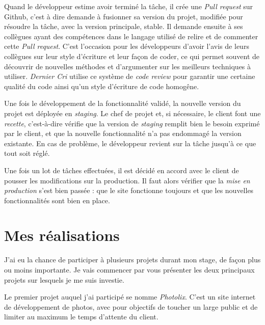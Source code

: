 \bigskip

Quand le développeur estime avoir terminé la tâche, il crée une
\emph{Pull request} sur Github, c'est à dire demande à fusionner sa
version du projet, modifiée pour résoudre la tâche, avec la version
principale, stable. Il demande ensuite à ses collègues ayant des
compétences dans le langage utilisé de relire et de commenter cette
\emph{Pull request}. C'est l'occasion pour les développeurs d'avoir
l'avis de leurs collègues sur leur style d'écriture et leur façon de
coder, ce qui permet souvent de découvrir de nouvelles méthodes et
d'argumenter sur les meilleurs techniques à utiliser. \emph{Dernier Cri}
utilise ce système de \emph{code review} pour garantir une certaine
qualité du code ainsi qu'un style d'écriture de code homogêne.

\bigskip

Une fois le développement de la fonctionnalité validé, la nouvelle
version du projet est déployée en \emph{staging}. Le chef de projet et,
si nécessaire, le client font une \emph{recette}, c'est-à-dire vérifie
que la version de \emph{staging} remplit bien le besoin exprimé par le
client, et que la nouvelle fonctionnalité n'a pas endommagé la version
existante. En cas de problème, le développeur revient sur la tâche
jusqu'à ce que tout soit réglé.

\bigskip

Une fois un lot de tâches effectuées, il est décidé en accord avec le
client de pousser les modifications sur la production. Il faut alors
vérifier que la \emph{mise en production} s'est bien passée : que le
site fonctionne toujours et que les nouvelles fonctionnalités sont bien
en place.

\newpage

\section{Mes réalisations}\label{mes-ruxe9alisations}

\bigskip

J'ai eu la chance de participer à plusieurs projets durant mon stage, de
façon plus ou moins importante. Je vais commencer par vous présenter les
deux principaux projets sur lesquels je me suis investie.

\bigskip

Le premier projet auquel j'ai participé se nomme \emph{Photolix}. C'est
un site internet de développement de photos, avec pour objectifs de
toucher un large public et de limiter au maximum le temps d'attente du
client.

